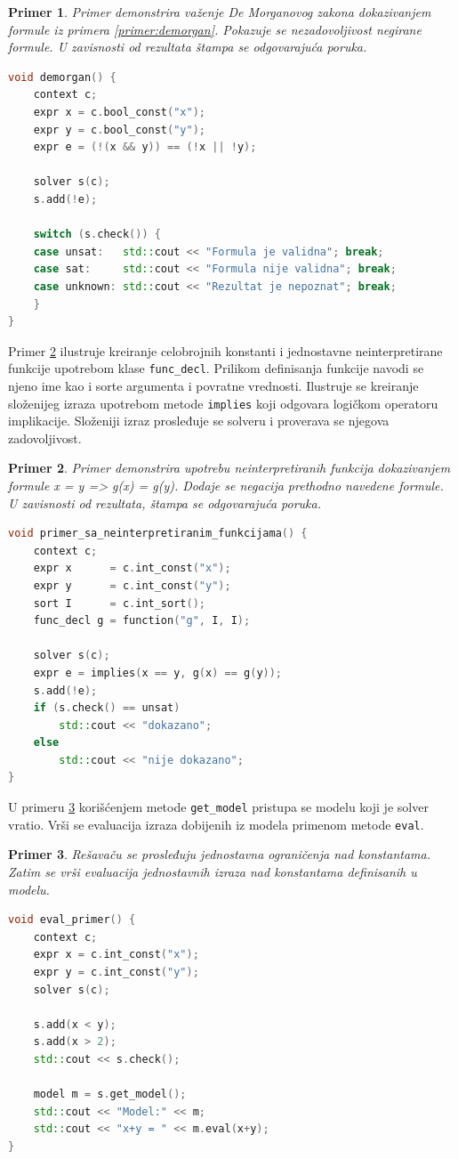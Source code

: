 \documentclass[12pt,oneside]{memoir}
\newtheorem{primer}{Primer}
\begin{document}
\begin{primer} \label{ex1} Primer demonstrira važenje De Morganovog zakona dokazivanjem formule iz primera \ref{primer:demorgan}. Pokazuje se nezadovoljivost negirane formule. U zavisnosti od rezultata štampa se odgovarajuća poruka.
\begin{lstlisting}[language=C++]
void demorgan() {
    context c;
    expr x = c.bool_const("x");
    expr y = c.bool_const("y");
    expr e = (!(x && y)) == (!x || !y);
    
    solver s(c);
    s.add(!e);

    switch (s.check()) {
    case unsat:   std::cout << "Formula je validna"; break;
    case sat:     std::cout << "Formula nije validna"; break;
    case unknown: std::cout << "Rezultat je nepoznat"; break;
    }
}
\end{lstlisting}
\end{primer}

Primer \ref{ex2} ilustruje kreiranje celobrojnih konstanti i jednostavne neinterpretirane funkcije upotrebom klase \texttt{func\_decl}. Prilikom definisanja funkcije navodi se njeno ime kao i sorte argumenta i povratne vrednosti. Ilustruje se kreiranje složenijeg izraza upotrebom metode \texttt{implies} koji odgovara logičkom operatoru implikacije. Složeniji izraz prosleđuje se solveru i proverava se njegova zadovoljivost.
\begin{primer} \label{ex2} Primer demonstrira upotrebu neinterpretiranih funkcija dokazivanjem formule x = y => g(x) = g(y). Dodaje se negacija prethodno navedene formule. U zavisnosti od rezultata, štampa se odgovarajuća poruka.\\
\begin{lstlisting}[language=C++]
void primer_sa_neinterpretiranim_funkcijama() { 
    context c;
    expr x      = c.int_const("x");
    expr y      = c.int_const("y");
    sort I      = c.int_sort();
    func_decl g = function("g", I, I);
    
    solver s(c);
    expr e = implies(x == y, g(x) == g(y));
    s.add(!e);
    if (s.check() == unsat) 
        std::cout << "dokazano";
    else
        std::cout << "nije dokazano";
}
\end{lstlisting}
\end{primer}
\par
U primeru \ref{ex3} korišćenjem metode \texttt{get\_model} pristupa se modelu koji je solver vratio. Vrši se evaluacija izraza dobijenih iz modela primenom metode \texttt{eval}.  
\begin{primer} \label{ex3} Rešavaču se prosleđuju jednostavna ograničenja nad konstantama. Zatim se vrši evaluacija jednostavnih izraza nad konstantama definisanih u modelu.
\begin{lstlisting}[language=C++]
void eval_primer() {
    context c;
    expr x = c.int_const("x");
    expr y = c.int_const("y");
    solver s(c);

    s.add(x < y);
    s.add(x > 2);
    std::cout << s.check();
    
    model m = s.get_model();
    std::cout << "Model:" << m;
    std::cout << "x+y = " << m.eval(x+y);
}
\end{lstlisting}
\end{primer}
\end{document}
